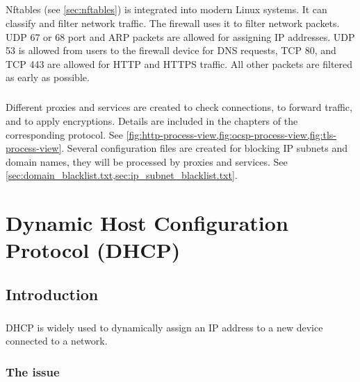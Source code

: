 \documentclass[mscthesis]{usiinfthesis}
\begin{document}
\paragraph{}
Nftables (see \cref{sec:nftables}) is integrated into modern Linux systems. It can classify and filter network traffic. The firewall uses it to filter network packets. UDP 67 or 68 port and ARP packets are allowed for assigning IP addresses. UDP 53 is allowed from users to the firewall device for DNS requests, TCP 80, and TCP 443 are allowed for HTTP and HTTPS traffic. All other packets are filtered as early as possible.
\paragraph{}
Different proxies and services are created to check connections, to forward traffic, and to apply encryptions. Details are included in the chapters of the corresponding protocol. See \cref{fig:http-process-view,fig:ocsp-process-view,fig:tls-process-view}. Several configuration files are created for blocking IP subnets and domain names, they will be processed by proxies and services. See \cref{sec:domain_blacklist.txt,sec:ip_subnet_blacklist.txt}.

\chapter{Dynamic Host Configuration Protocol (DHCP)}\label{cha:dhcp}

\section{Introduction}
\paragraph{}
DHCP is widely used to dynamically assign an IP address to a new device connected to a network.

\subsection{The issue}
\end{document}

